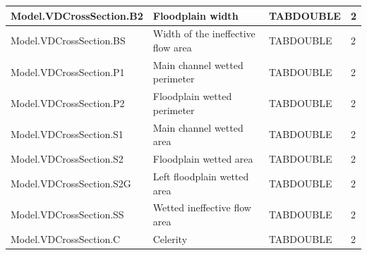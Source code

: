 \documentclass[a4paper,11pt]{article}
\begin{document}
\begin{landscape}
\begin{table}[ht]
\begin{center}
\begin{tabular}{|l|l|l|l|}
\hline  Model.VDCrossSection.B2 & Floodplain width & TABDOUBLE & 2 \\
\hline  Model.VDCrossSection.BS & Width of the ineffective flow area & TABDOUBLE & 2 \\
\hline  Model.VDCrossSection.P1 & Main channel wetted perimeter & TABDOUBLE & 2 \\
\hline  Model.VDCrossSection.P2 & Floodplain wetted perimeter & TABDOUBLE & 2 \\
\hline  Model.VDCrossSection.S1 & Main channel wetted area & TABDOUBLE & 2 \\
\hline  Model.VDCrossSection.S2 & Floodplain wetted area & TABDOUBLE & 2 \\
\hline  Model.VDCrossSection.S2G & Left floodplain wetted area & TABDOUBLE & 2 \\
\hline  Model.VDCrossSection.SS & Wetted ineffective flow area & TABDOUBLE & 2 \\
\hline  Model.VDCrossSection.C & Celerity & TABDOUBLE & 2 \\
\hline

\end{tabular} 
\end{center}
\end{table}
\begin{table}[ht]
\begin{center}
\begin{tabular}{|l|l|l|l|}


\end{tabular}
\end{center}
\end{table}
\end{landscape}
\end{document}
